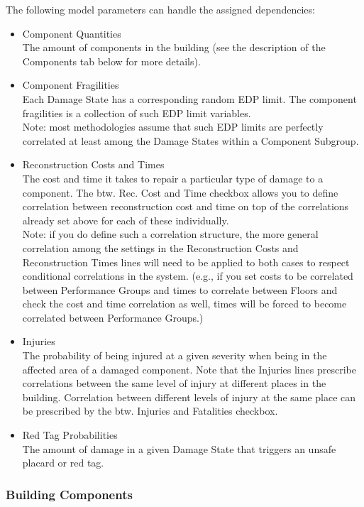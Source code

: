 The following model parameters can handle the assigned dependencies:

\begin{itemize}
    \item Component Quantities\\
    The amount of components in the building (see the description of the Components tab below for more details).
    \item Component Fragilities\\
    Each Damage State has a corresponding random EDP limit. The component fragilities is a collection of such EDP limit variables.\\
    Note: most methodologies assume that such EDP limits are perfectly correlated at least among the Damage States within a Component Subgroup.
    \item Reconstruction Costs and Times\\
    The cost and time it takes to repair a particular type of damage to a component. The btw. Rec. Cost and Time checkbox allows you to define correlation between reconstruction cost and time on top of the correlations already set above for each of these individually. \\
    Note: if you do define such a correlation structure, the more general correlation among the settings in the Reconstruction Costs and Reconstruction Times lines will need to be applied to both cases to respect conditional correlations in the system. (e.g., if you set costs to be correlated between Performance Groups and times to correlate between Floors and check the cost and time correlation as well, times will be forced to become correlated between Performance Groups.)
    \item Injuries\\
    The probability of being injured at a given severity when being in the affected area of a damaged component. Note that the Injuries lines prescribe correlations between the same level of injury at different places in the building. Correlation between different levels of injury at the same place can be prescribed by the btw. Injuries and Fatalities checkbox.
    \item Red Tag Probabilities\\
    The amount of damage in a given Damage State that triggers an unsafe placard or red tag.
\end{itemize}

\subsubsection{Building Components}

